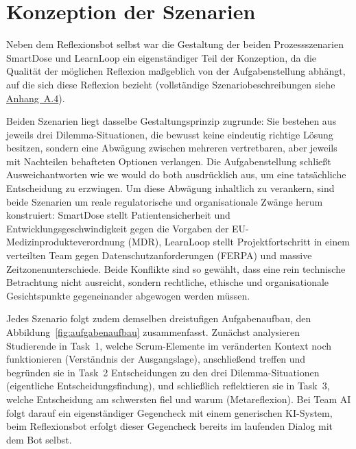 \section{Konzeption der Szenarien}
\label{sec:konzeption-szenarien}

Neben dem Reflexionsbot selbst war die Gestaltung der beiden Prozessszenarien SmartDose und
LearnLoop ein eigenständiger Teil der Konzeption, da die Qualität der möglichen Reflexion maßgeblich
von der Aufgabenstellung abhängt, auf die sich diese Reflexion bezieht (vollständige
Szenariobeschreibungen siehe \hyperref[app:szenarien]{Anhang~A.4}).

Beiden Szenarien liegt dasselbe Gestaltungsprinzip zugrunde: Sie bestehen aus jeweils drei
Dilemma-Situationen, die bewusst keine eindeutig richtige Lösung besitzen, sondern eine Abwägung
zwischen mehreren vertretbaren, aber jeweils mit Nachteilen behafteten Optionen verlangen. Die
Aufgabenstellung schließt Ausweichantworten wie \glqq we would do both\grqq{} ausdrücklich aus, um
eine tatsächliche Entscheidung zu erzwingen. Um diese Abwägung inhaltlich zu verankern, sind beide
Szenarien um reale regulatorische und organisationale Zwänge herum konstruiert: SmartDose stellt
Patientensicherheit und Entwicklungsgeschwindigkeit gegen die Vorgaben der EU-Medizinprodukteverordnung
(MDR), LearnLoop stellt Projektfortschritt in einem verteilten Team gegen Datenschutzanforderungen
(FERPA) und massive Zeitzonenunterschiede. Beide Konflikte sind so gewählt, dass eine rein technische
Betrachtung nicht ausreicht, sondern rechtliche, ethische und organisationale Gesichtspunkte
gegeneinander abgewogen werden müssen.

Jedes Szenario folgt zudem demselben dreistufigen Aufgabenaufbau, den
Abbildung~\ref{fig:aufgabenaufbau} zusammenfasst. Zunächst analysieren Studierende
in Task~1, welche Scrum-Elemente im veränderten Kontext noch funktionieren (Verständnis der
Ausgangslage), anschließend treffen und begründen sie in Task~2 Entscheidungen zu den drei
Dilemma-Situationen (eigentliche Entscheidungsfindung), und schließlich reflektieren sie in Task~3,
welche Entscheidung am schwersten fiel und warum (Metareflexion). Bei Team AI folgt darauf ein
eigenständiger Gegencheck mit einem generischen KI-System, beim Reflexionsbot erfolgt dieser
Gegencheck bereits im laufenden Dialog mit dem Bot selbst.


